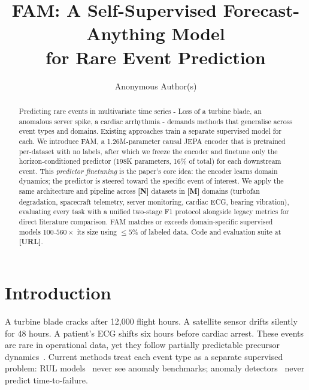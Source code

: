 \documentclass{article}
\title{FAM: A Self-Supervised Forecast-Anything Model\\for Rare Event Prediction}
\author{Anonymous Author(s)}
\newcommand{\placeholder}[1]{{\color{red}\textbf{[#1]}}}
\newcommand{\placeholder}[1]{#1}
\begin{document}
\maketitle

\begin{abstract}
Predicting rare events in multivariate time series - Loss of a turbine blade, an anomalous server spike, a cardiac arrhythmia - demands methods that generalise across event types and domains. Existing approaches train a separate supervised model for each. We introduce FAM, a 1.26M-parameter causal JEPA encoder that is pretrained per-dataset with no labels, after which we freeze the encoder and finetune only the horizon-conditioned predictor (198K parameters, 16\% of total) for each downstream event. This \emph{predictor finetuning} is the paper's core idea: the encoder learns domain dynamics; the predictor is steered toward the specific event of interest. We apply the same architecture and pipeline across \placeholder{N} datasets in \placeholder{M} domains (turbofan degradation, spacecraft telemetry, server monitoring, cardiac ECG, bearing vibration), evaluating every task with a unified two-stage F1 protocol alongside legacy metrics for direct literature comparison. FAM matches or exceeds domain-specific supervised models $100$-$560\times$ its size using $\leq 5\%$ of labeled data. Code and evaluation suite at \placeholder{URL}.
\end{abstract}

\section{Introduction}
\label{sec:intro}

A turbine blade cracks after 12{,}000 flight hours. A satellite sensor drifts silently for 48 hours. A patient's ECG shifts six hours before cardiac arrest. These events are rare in operational data, yet they follow partially predictable precursor dynamics~\citep{taleb2007blackswan,scheffer2009earlywarning}. Current methods treat each event type as a separate supervised problem: RUL models~\citep{fan2024star} never see anomaly benchmarks; anomaly detectors~\citep{xu2022anomalytransformer,mtsjepa2026} never predict time-to-failure.
\end{document}
